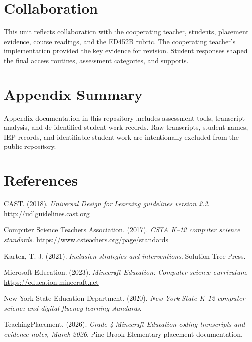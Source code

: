 \documentclass[12pt]{article}
\begin{document}
\section{Collaboration}
This unit reflects collaboration with the cooperating teacher, students, placement evidence, course readings, and the ED452B rubric. The cooperating teacher's implementation provided the key evidence for revision. Student responses shaped the final access routines, assessment categories, and supports.

\section{Appendix Summary}
Appendix documentation in this repository includes assessment tools, transcript analysis, and de-identified student-work records. Raw transcripts, student names, IEP records, and identifiable student work are intentionally excluded from the public repository.

\section{References}
CAST. (2018). \emph{Universal Design for Learning guidelines version 2.2}. \url{http://udlguidelines.cast.org}

Computer Science Teachers Association. (2017). \emph{CSTA K--12 computer science standards}. \url{https://www.csteachers.org/page/standards}

Karten, T. J. (2021). \emph{Inclusion strategies and interventions}. Solution Tree Press.

Microsoft Education. (2023). \emph{Minecraft Education: Computer science curriculum}. \url{https://education.minecraft.net}

New York State Education Department. (2020). \emph{New York State K--12 computer science and digital fluency learning standards}.

TeachingPlacement. (2026). \emph{Grade 4 Minecraft Education coding transcripts and evidence notes, March 2026}. Pine Brook Elementary placement documentation.
\end{document}

